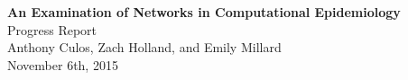 \begin{titlepage}
\begin{center}
\vspace*{150px}
\LARGE{\textbf{An Examination of Networks in Computational Epidemiology} \\}
\vspace{12px}
\Large{Progress Report\\}
\vspace{12px}
\large{Anthony Culos, Zach Holland, and Emily Millard \\}
\vspace{12px}
\large{November 6th, 2015 \\}
\end{center}
\end{titlepage}